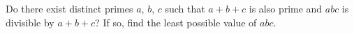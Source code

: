 Do there exist distinct primes $a$, $b$, $c$ such that $a+b+c$ is also prime and $abc$ is divisible by $a+b+c$? If so, find the least possible value of $abc$.
